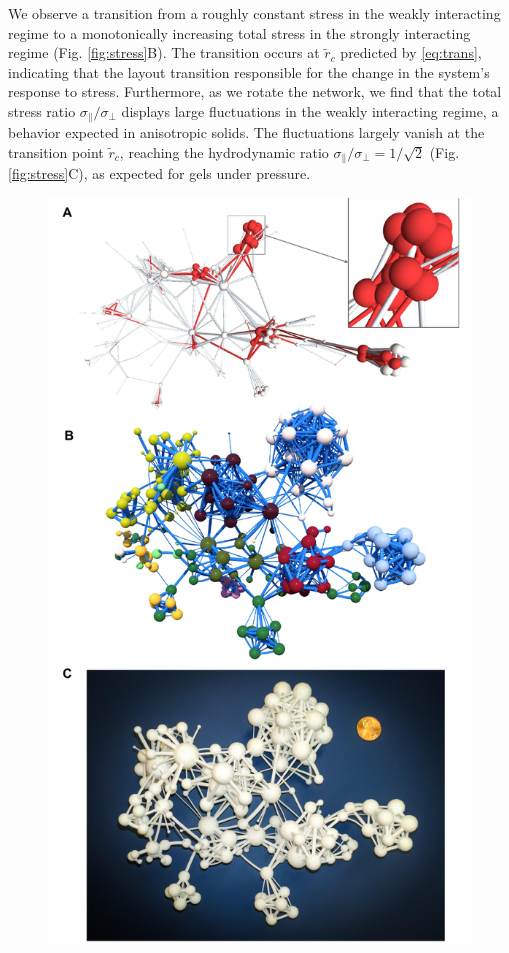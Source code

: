 \documentclass[nofootinbib,preprint,floatfix,titlepage,superscriptaddress]{revtex4} %
\begin{document}
We observe a transition from a roughly constant stress in the weakly interacting regime to a monotonically increasing total stress in the strongly interacting regime (Fig. \ref{fig:stress}B). 
The transition occurs at $\tilde{r}_c$ predicted by \eqref{eq:trans}, indicating that the layout transition responsible for the change in the system's response to stress.  
Furthermore, as we rotate the network, we
find that the total stress ratio $ \sigma_\parallel/ \sigma_\perp$ displays large fluctuations in the weakly interacting regime, a behavior expected in anisotropic solids. 
The fluctuations largely vanish at the transition point $\tilde{r}_c$, reaching the hydrodynamic ratio $\sigma_\parallel/\sigma_\perp = 1/\sqrt{2}$  (Fig. \ref{fig:stress}C), as expected for gels under pressure. 
  
\begin{figure}
    \centering
    \vspace{-2cm}
    \includegraphics[height=\textheight]{fig-09-19/Flavor-111217.pdf}

\end{figure}
\end{document}
